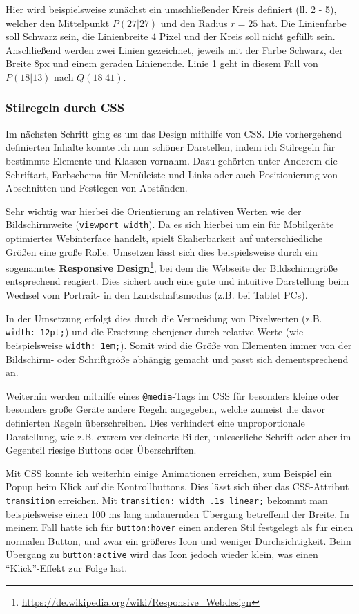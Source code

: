 \documentclass[xcolor=dvipsnames,11pt,paper=a4paper]{report}
\begin{document}
Hier wird beispielsweise zunächst ein umschließender Kreis definiert (ll. 2 - 5),
welcher den Mittelpunkt $P(27|27)$ und den Radius $r = 25$ hat. Die Linienfarbe
soll Schwarz sein, die Linienbreite 4 Pixel und der Kreis soll nicht gefüllt sein.
Anschließend werden zwei Linien gezeichnet, jeweils mit der Farbe Schwarz, der Breite
8px und einem geraden Linienende. Linie 1 geht in diesem Fall von $P(18|13)$ nach
$Q(18|41)$.

\subsubsection{Stilregeln durch CSS}

Im nächsten Schritt ging es um das Design mithilfe von CSS. Die vorhergehend definierten
Inhalte konnte ich nun schöner Darstellen, indem ich Stilregeln für bestimmte Elemente
und Klassen vornahm. Dazu gehörten unter Anderem die Schriftart, Farbschema für
Menüleiste und Links oder auch Positionierung von Abschnitten und Festlegen von
Abständen.

Sehr wichtig war hierbei die Orientierung an relativen Werten wie der Bildschirmweite
(\texttt{viewport width}). Da es sich hierbei um ein für Mobilgeräte optimiertes
Webinterface handelt, spielt Skalierbarkeit auf unterschiedliche Größen eine große
Rolle. Umsetzen lässt sich dies beispielsweise durch ein sogenanntes \textbf{Responsive
Design}\footnote{\url{https://de.wikipedia.org/wiki/Responsive_Webdesign}}, bei dem
die Webseite der Bildschirmgröße entsprechend reagiert. Dies sichert auch eine gute
und intuitive Darstellung beim Wechsel vom Portrait- in den Landschaftsmodus (z.B.
bei Tablet PCs).

In der Umsetzung erfolgt dies durch die Vermeidung von Pixelwerten (z.B. \texttt{width: 12pt;})
und die Ersetzung ebenjener durch relative Werte (wie beispielsweise \texttt{width: 1em;}).
Somit wird die Größe von Elementen immer von der Bildschirm- oder Schriftgröße abhängig
gemacht und passt sich dementsprechend an.

Weiterhin werden mithilfe eines \texttt{@media}-Tags im CSS für besonders kleine oder
besonders große Geräte andere Regeln angegeben, welche zumeist die davor definierten
Regeln überschreiben. Dies verhindert eine unproportionale Darstellung, wie z.B.
extrem verkleinerte Bilder, unleserliche Schrift oder aber im Gegenteil riesige
Buttons oder Überschriften.

Mit CSS konnte ich weiterhin einige Animationen erreichen, zum Beispiel ein Popup
beim Klick auf die Kontrollbuttons. Dies lässt sich über das CSS-Attribut \texttt{transition}
erreichen. Mit \texttt{transition: width .1s linear;} bekommt man beispielsweise
einen 100 ms lang andauernden Übergang betreffend der Breite. In meinem Fall hatte
ich für \texttt{button:hover} einen anderen Stil festgelegt als für einen normalen
Button, und zwar ein größeres Icon und weniger Durchsichtigkeit. Beim Übergang zu
\texttt{button:active} wird das Icon jedoch wieder klein, was einen ``Klick''-Effekt
zur Folge hat.
\end{document}
